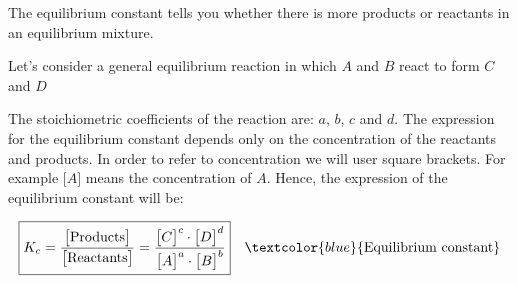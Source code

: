 \documentclass[main.tex]{subfiles}
\newcommand\chapterlabel{equilibrium}
\begin{document}
\begin{description}
\begin{marginfigure}[-0cm]
\caption{The equilibrium constant tells you whether there is more products or reactants in an equilibrium mixture.  }
\end{marginfigure}%



\item[\docfilehook{Equilibrium constant expression}{Equilibrium constant expression}] Let's consider a general equilibrium reaction in which $A$ and $B$ react to form $C$ and $D$
\begin{center}
\end{center}
The stoichiometric coefficients of the reaction are: $a$, $b$, $c$ and $d$. The expression for the equilibrium constant depends only on the concentration of the reactants and products. In order to refer to concentration we will user square brackets. For example $\big[ A \big]$ means the concentration of $A$. Hence, the expression of the equilibrium constant will be:

\begin{equation}
\boxed{  K_{c}=\frac{\big[\text{Products}\big]}{\big[\text{Reactants}\big]}=\frac{\big[ C \big]^c \cdot \big[ D \big]^d} {\big[ A \big]^a \cdot \big[ B \big]^b} } \quad \textcolor{blue}{\text{Equilibrium constant}}\label{\chapterlabel:equation1}
\end{equation}


\end{description}
\end{document}
